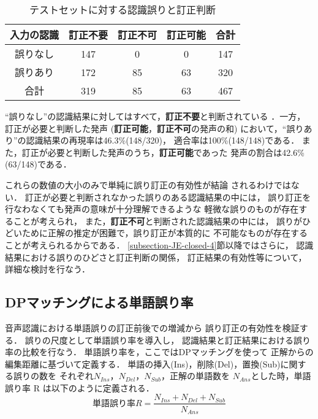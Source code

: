 \begin{table}
\begin{center}
\caption{テストセットに対する認識誤りと訂正判断}
\begin{tabular}{|c||c|c|c||c|} \hline
入力の認識 & 訂正不要 & 訂正不可 & 訂正可能 & 合計\\ \hline\hline
誤りなし & 147 & 0 & 0 & 147 \\ \hline
誤りあり & 172 & 85 & 63 & 320 \\ \hline\hline
合計 & 319 & 85 & 63 & 467 \\ \hline
\end{tabular}
\label{JE-closed-judgement}
\end{center}
\end{table}

``誤りなし''の認識結果に対してはすべて，{\bf 訂正不要}と判断されている
．一方，訂正が必要と判断した発声
({\bf 訂正可能}，{\bf 訂正不可}の発声の和)
において，``誤りあり''の認識結果の再現率は46.3\%(148/320)，
適合率は100\%(148/148)である．
また，訂正が必要と判断した発声のうち，{\bf 訂正可能}であった
発声の割合は42.6\%(63/148)である．

これらの数値の大小のみで単純に誤り訂正の有効性が結論
されるわけではない．
訂正が必要と判断されなかった誤りのある認識結果の中には，
誤り訂正を行なわなくても発声の意味が十分理解できるような
軽微な誤りのものが存在することが考えられ，
また，{\bf 訂正不可}と判断された認識結果の中には，
誤りがひどいために正解の推定が困難で，誤り訂正が本質的に
不可能なものが存在することが考えられるからである．
\ref{subsection-JE-closed-4}節以降ではさらに，
認識結果における誤りのひどさと訂正判断の関係，
訂正結果の有効性等について，詳細な検討を行なう．


\subsection{DPマッチングによる単語誤り率}

音声認識における単語誤りの訂正前後での増減から
誤り訂正の有効性を検証する．
誤りの尺度として単語誤り率を導入し，
認識結果と訂正結果における誤り率の比較を行なう．
単語誤り率を，ここではDPマッチングを使って
正解からの編集距離に基づいて定義する．
単語の挿入(Ins)，削除(Del)，置換(Sub)に関する誤りの数を
それぞれ$N_{Ins}$，$N_{Del}$，$N_{Sub}$，正解の単語数を
$N_{Ans}$とした時，単語誤り率 R は以下のように定義される．
\begin{displaymath}
単語誤り率 R = \frac{N_{Ins} + N_{Del} + N_{Sub}}{N_{Ans}}
\end{displaymath}


